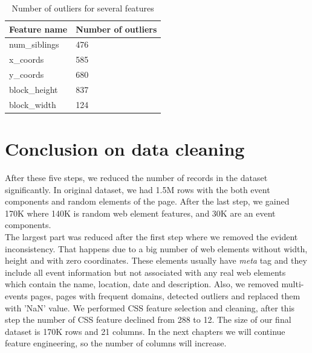 \begin{table}[h]
\begin{center}
{\renewcommand{\arraystretch}{1.5}
\begin{tabular}{| p{5cm} | p{5cm}|}
\hline
\textbf{Feature name}	& \textbf{Number of outliers}\\
\hline
num\_siblings	& 476\\
\hline
x\_coords	& 585\\
\hline
y\_coords	& 680\\
\hline
block\_height	& 837\\
\hline
block\_width	& 124\\
\hline
\end{tabular}}
\caption{Number of outliers for several features}
\label{table:outlier}
\end{center}
\end{table}



\section*{Conclusion on data cleaning}
After these five steps, we reduced the number of records in the dataset significantly. In original dataset, we had 1.5M rows with the both event components and random elements of the page. After the last step, we gained 170K where 140K is random web element features, and 30K are an event components.\\
The largest part was reduced after the first step where we removed the evident inconsistency. That happens due to a big number of web elements without width, height and with zero coordinates. These elements usually have \textit{meta} tag and they include all event information but not associated with any real web elements which contain the name, location, date and description. Also, we removed multi-events pages, pages with frequent domains, detected outliers and replaced them with 'NaN' value. We performed CSS feature selection and cleaning, after this step the number of CSS feature declined from 288 to 12. The size of our final dataset is 170K rows and 21 columns. In the next chapters we will continue feature engineering, so the number of columns will increase.